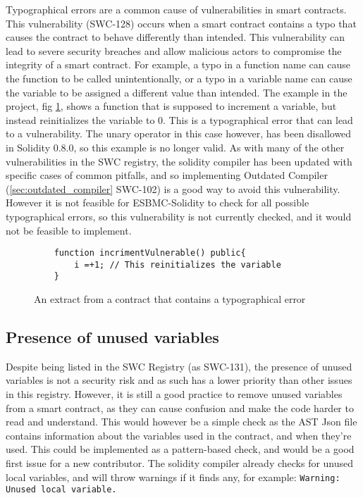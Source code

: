 Typographical errors are a common cause of vulnerabilities in smart contracts. This vulnerability (SWC-128) occurs when a smart contract contains a typo that causes the contract to behave differently than intended. This vulnerability can lead to severe security breaches and allow malicious actors to compromise the integrity of a smart contract. For example, a typo in a function name can cause the function to be called unintentionally, or a typo in a variable name can cause the variable to be assigned a different value than intended. The example in the project, fig \ref{fig:typographical_error}, shows a function that is supposed to increment a variable, but instead reinitializes the variable to 0. This is a typographical error that can lead to a vulnerability. The unary operator in this case however, has been disallowed in Solidity 0.8.0, so this example is no longer valid. As with many of the other vulnerabilities in the SWC registry, the solidity compiler has been updated with specific cases of common pitfalls, and so implementing Outdated Compiler (\ref{sec:outdated_compiler} SWC-102) is a good way to avoid this vulnerability. However it is not feasible for ESBMC-Solidity to check for all possible typographical errors, so this vulnerability is not currently checked, and it would not be feasible to implement.

\begin{figure}
\begin{lstlisting}
    function incrimentVulnerable() public{
        i =+1; // This reinitializes the variable
    }
\end{lstlisting}
\caption{An extract from a contract that contains a typographical error}
\label{fig:typographical_error}
\end{figure}

\subsection{Presence of unused variables}
\label{sec:presence_of_unused_variables}

Despite being listed in the SWC Registry (as SWC-131), the presence of unused variables is not a security risk and as such has a lower priority than other issues in this registry. However, it is still a good practice to remove unused variables from a smart contract, as they can cause confusion and make the code harder to read and understand. This would however be a simple check as the AST Json file contains information about the variables used in the contract, and when they're used. This could be implemented as a pattern-based check, and would be a good first issue for a new contributor. The solidity compiler already checks for unused local variables, and will throw warnings if it finds any, for example: \verb|Warning: Unused local variable.|

